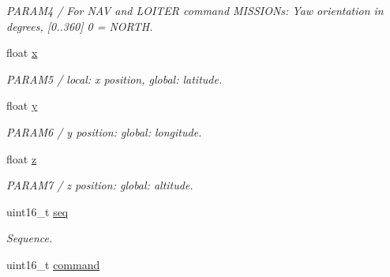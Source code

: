 \begin{DoxyCompactItemize}
\begin{DoxyCompactList}\small\item\em P\+A\+R\+A\+M4 / For N\+A\+V and L\+O\+I\+T\+E\+R command M\+I\+S\+S\+I\+O\+Ns\+: Yaw orientation in degrees, \mbox{[}0..360\mbox{]} 0 = N\+O\+R\+T\+H. \end{DoxyCompactList}\item 
\hypertarget{struct____mavlink__mission__item__t_a578c43dbf85decd47437180c89407f93}{float \hyperlink{struct____mavlink__mission__item__t_a578c43dbf85decd47437180c89407f93}{x}}\label{struct____mavlink__mission__item__t_a578c43dbf85decd47437180c89407f93}

\begin{DoxyCompactList}\small\item\em P\+A\+R\+A\+M5 / local\+: x position, global\+: latitude. \end{DoxyCompactList}\item 
\hypertarget{struct____mavlink__mission__item__t_a916e8ea61a94ce7b854ebd11cc5eea37}{float \hyperlink{struct____mavlink__mission__item__t_a916e8ea61a94ce7b854ebd11cc5eea37}{y}}\label{struct____mavlink__mission__item__t_a916e8ea61a94ce7b854ebd11cc5eea37}

\begin{DoxyCompactList}\small\item\em P\+A\+R\+A\+M6 / y position\+: global\+: longitude. \end{DoxyCompactList}\item 
\hypertarget{struct____mavlink__mission__item__t_adfa6844101b755c5e439b46f21ba0be8}{float \hyperlink{struct____mavlink__mission__item__t_adfa6844101b755c5e439b46f21ba0be8}{z}}\label{struct____mavlink__mission__item__t_adfa6844101b755c5e439b46f21ba0be8}

\begin{DoxyCompactList}\small\item\em P\+A\+R\+A\+M7 / z position\+: global\+: altitude. \end{DoxyCompactList}\item 
\hypertarget{struct____mavlink__mission__item__t_a0038a8dc2e0dc3757272b160a0cbaac2}{uint16\+\_\+t \hyperlink{struct____mavlink__mission__item__t_a0038a8dc2e0dc3757272b160a0cbaac2}{seq}}\label{struct____mavlink__mission__item__t_a0038a8dc2e0dc3757272b160a0cbaac2}

\begin{DoxyCompactList}\small\item\em Sequence. \end{DoxyCompactList}\item 
\hypertarget{struct____mavlink__mission__item__t_ad5a94a67caa147049e45c3754f15daa7}{uint16\+\_\+t \hyperlink{struct____mavlink__mission__item__t_ad5a94a67caa147049e45c3754f15daa7}{command}}\label{struct____mavlink__mission__item__t_ad5a94a67caa147049e45c3754f15daa7}


\end{DoxyCompactItemize}
